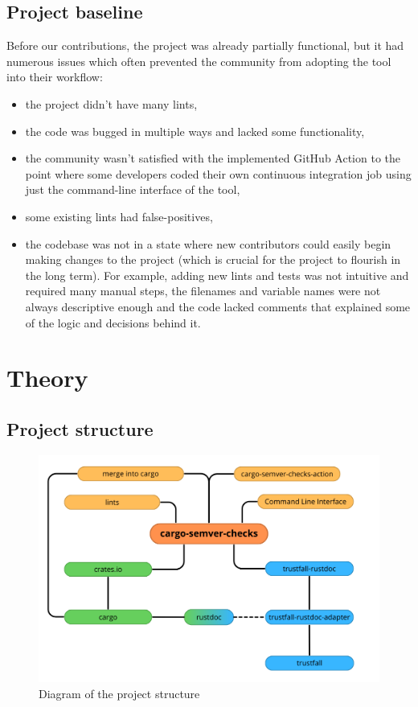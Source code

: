 \documentclass[licencjacka,en]{pracamgr}
\begin{document}
\section{Project baseline}

Before our contributions, the project was already partially functional, but it had numerous issues
which often prevented the community from adopting the tool into their workflow:
\begin{itemize}
	\item the project didn't have many lints,
	\item the code was bugged in multiple ways and lacked some functionality,
	\item the community wasn't satisfied with the implemented GitHub Action to the point where some
		developers coded their own continuous integration job using just the command-line interface
		of the tool,
	\item some existing lints had false-positives,
	\item the codebase was not in a state where new contributors could easily begin making changes
		to the project (which is crucial for the project to flourish in the long term).
		For example, adding new lints and tests was not intuitive and required many manual steps,
		the filenames and variable names were not always descriptive enough and the code lacked
		comments that explained some of the logic and decisions behind it.
\end{itemize}


\chapter{Theory}\label{r:chapter_theory}

\section{Project structure}\label{r:section_project_structure}

\begin{figure}[h]
	\centering
	\includegraphics[width=\linewidth]{project-structure-diagram.png}
	\caption{Diagram of the project structure}
\end{figure}
\end{document}
